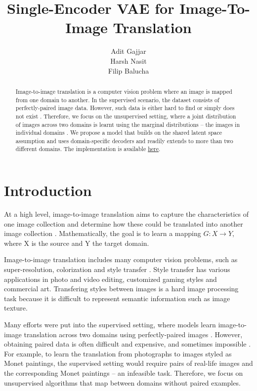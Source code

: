 \documentclass{article}
\title{Single-Encoder VAE for Image-To-Image Translation}
\author{%
  Adit Gajjar
  \\
  \And
  Harsh Nasit \\
  \And
  Filip Balucha \\
}
\begin{document}
\maketitle

\begin{abstract}
  Image-to-image translation is a computer vision problem where an image is mapped from one domain to another. In the supervised scenario, the dataset consists of perfectly-paired image data. However, such data is either hard to find or simply does not exist \citep{zhu}. Therefore, we focus on the unsupervised setting, where a joint distribution of images across two domains is learnt using the marginal distributions – the images in individual domains \citep{liu}. We propose a model that builds on the shared latent space assumption and uses domain-specific decoders and readily extends to more than two different domains. The implementation is available \href{https://github.com/HareshNasit/CSC413-Project}{here}.
\end{abstract}
\section{Introduction}
At a high level, image-to-image translation aims to capture the characteristics of one image collection and determine how these could be translated into another image collection \citep{zhu}. Mathematically, the goal is to learn a mapping $G: X \rightarrow Y$, where X is the source and Y the target domain.

Image-to-image translation includes many computer vision problems, such as super-resolution, colorization and style transfer \citep{liu}. Style transfer has various applications in photo and video editing, customized gaming styles and commercial art. Transfering styles between images is a hard image processing task because it is difficult to represent semantic information such as image texture.

Many efforts were put into the supervised setting, where models learn image-to-image translation across two domains using perfectly-paired images \citep{zhu}. However, obtaining paired data is often difficult and expensive, and sometimes impossible \citep{zhu}. For example, to learn the translation from photographs to images styled as Monet paintings, the supervised setting would require pairs of real-life images and the corresponding Monet paintings – an infeasible task. Therefore, we focus on unsupervised algorithms that map between domains without paired examples.
\end{document}
